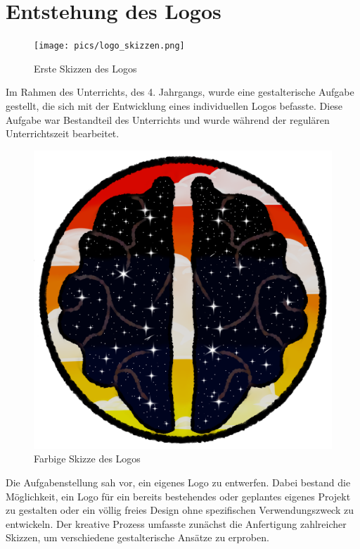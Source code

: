 \section{Entstehung des Logos}


\begin{figure}
    \centering
    \texttt{[image: pics/logo\_skizzen.png]}
    \caption{Erste Skizzen des Logos}
    \label{fig:logo-skizzen}
\end{figure}

Im Rahmen des Unterrichts, des 4. Jahrgangs, wurde eine gestalterische Aufgabe 
gestellt, die sich mit der Entwicklung eines individuellen Logos befasste. Diese 
Aufgabe war Bestandteil des Unterrichts und wurde während der regulären Unterrichtszeit 
bearbeitet. 


\begin{figure}
    \centering
    \includegraphics[scale=0.2]{pics/Farbige Skizze.png}
    \caption{Farbige Skizze des Logos}
    \label{fig:logo-farbige-skizze}
\end{figure}

Die Aufgabenstellung sah vor, ein eigenes Logo zu entwerfen. Dabei bestand die 
Möglichkeit, ein Logo für ein bereits bestehendes oder geplantes eigenes Projekt 
zu gestalten oder ein völlig freies Design ohne spezifischen Verwendungszweck zu 
entwickeln. Der kreative Prozess umfasste zunächst die Anfertigung zahlreicher 
Skizzen, um verschiedene gestalterische Ansätze zu erproben.

